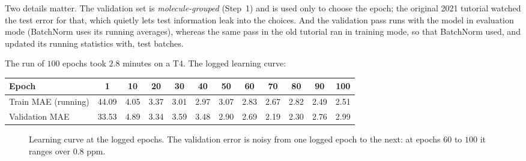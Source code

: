 \documentclass[11pt]{article}
\begin{document}
Two details matter. The validation set is \emph{molecule-grouped} (Step~1) and is used only to choose the epoch; the original 2021 tutorial watched the test error for that, which quietly lets test information leak into the choices. And the validation pass runs with the model in evaluation mode (BatchNorm uses its running averages), whereas the same pass in the old tutorial ran in training mode, so that BatchNorm used, and updated its running statistics with, test batches.

The run of $100$ epochs took $2.8$ minutes on a T4. The logged learning curve:

\begin{center}
\small
\begin{tabular}{@{}lccccccccccc@{}}
\toprule
Epoch & 1 & 10 & 20 & 30 & 40 & 50 & 60 & 70 & 80 & 90 & 100\\
\midrule
Train MAE (running) & 44.09 & 4.05 & 3.37 & 3.01 & 2.97 & 3.07 & 2.83 & 2.67 & 2.82 & 2.49 & 2.51\\
Validation MAE & 33.53 & 4.89 & 3.34 & 3.59 & 3.48 & 2.90 & 2.69 & 2.19 & 2.30 & 2.76 & 2.99\\
\bottomrule
\end{tabular}
\end{center}

\begin{figure}[ht]
\centering
{}
\caption{Learning curve at the logged epochs. The validation error is noisy from one logged epoch to the next: at epochs $60$ to $100$ it ranges over $0.8$ ppm.}
\label{fig:curve}
\end{figure}
\end{document}
